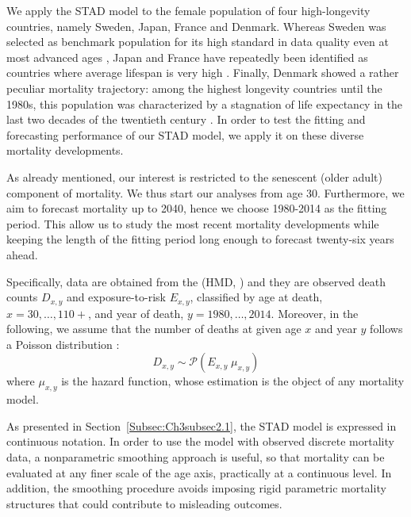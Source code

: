 \documentclass[Thesis]{subfiles}
\begin{document}
We apply the STAD model to the female population of four high-longevity countries, namely Sweden, Japan, France and Denmark. Whereas Sweden was selected as benchmark population for its high standard in data quality even at most advanced ages \citep{vaupel1994longer,wilmoth1996extreme}, Japan and France have repeatedly been identified as countries where average lifespan is very high \citep{wilmoth1996extreme,oeppen2002broken,cheung2007increase,canudas2008modal,canudas2010three,horiuchi2013modal}. Finally, Denmark showed a rather peculiar mortality trajectory: among the highest longevity countries until the 1980s, this population was characterized by a stagnation of life expectancy in the last two decades of the twentieth century \citep{christensen2010divergent, lindahl2016did, lindahl2016rise}. In order to test the fitting and forecasting performance of our STAD model, we apply it on these diverse mortality developments.

As already mentioned, our interest is restricted to the senescent (older adult) component of mortality. We thus start our analyses from age 30. Furthermore, we aim to forecast mortality up to 2040, hence we choose 1980-2014 as the fitting period. This allow us to study the most recent mortality developments \citep[excluding improvements in the 1970s due to the cardiovascular revolution,][]{vallin2004convergences} while keeping the length of the fitting period long enough to forecast twenty-six years ahead. 

Specifically, data are obtained from the \citeauthor{HMD} (HMD, \citeyear{HMD}) and they are observed death counts $D_{x,y}$ and  exposure-to-risk $E_{x,y}$, classified by age at death, $x=30,\ldots, 110+$, and year of death, $y=1980, \ldots, 2014$. Moreover, in the following,  we assume that the number of deaths at given age $x$ and year $y$ follows a Poisson distribution
\citep{brillinger1986biometrics}: 
%
\begin{equation}\label{Eq:Ch3Poisson}
D_{x,y} \sim \mathcal{P}(E_{x,y} \; \mu_{x,y}) 
\end{equation}
%
where $\mu_{x,y}$ is the hazard function, whose estimation is the object of any mortality model.

As presented in Section~\ref{Subsec:Ch3subsec2.1}, the STAD model is expressed in continuous notation. In order to use the model with observed discrete mortality data, a nonparametric smoothing approach is useful, so that mortality can be evaluated at any finer scale of the age axis, practically at a continuous level. In addition, the smoothing procedure avoids imposing rigid parametric mortality structures that could contribute to misleading outcomes. 
\end{document}
